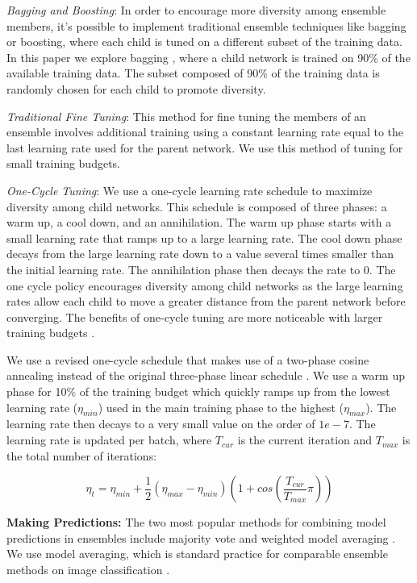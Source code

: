 \documentclass[letterpaper]{article} %
\begin{document}
\textit{Bagging and Boosting}:
In order to encourage more diversity among ensemble members, it's possible to implement traditional ensemble techniques like bagging or boosting, where each child is tuned on a different subset of the training data.   In this paper we explore bagging \cite{breiman1996bagging},  where a child network is trained on 90\%
of the available training data.  The subset composed of 90\% of the training data is randomly chosen for each child to promote diversity.

\textit{Traditional Fine Tuning}: This method for fine tuning the members of an ensemble involves additional training using a constant learning rate equal to the last learning rate used for the parent network. We use this method of tuning for small training budgets.

\textit{One-Cycle Tuning}: We use a one-cycle learning rate schedule \cite{smith2018superconvergence} to maximize diversity among child networks. This schedule is composed of three phases: a warm up, a cool down, and an annihilation. The warm up phase starts with a small learning rate that ramps up to a large learning rate. The cool down phase decays from the large learning rate down to a value several times smaller than the initial learning rate. The annihilation phase then decays the rate to 0. The one cycle policy encourages diversity among child networks as the large learning rates allow each child to move a greater distance from the parent network before converging.
The benefits of one-cycle tuning are more noticeable with larger training budgets \cite{le2021network}.

We use a revised one-cycle schedule that makes use of a two-phase cosine annealing instead of the original three-phase linear schedule \cite{le2021network}. We use a warm up phase for 10\% of the training budget which quickly ramps up from the lowest learning rate ($\eta_{min}$) used in the main training phase to the highest ($\eta_{max}$). The learning rate then decays to a very small value on the order of $1e-7$. The learning rate is updated per batch, where $T_{cur}$ is the current iteration and $T_{max}$ is the total number of iterations:

\[
\eta_t = \eta_{min} + \frac{1}{2}(\eta_{max} - \eta_{min})
(1 + cos(\frac{T_{cur}}{T_{max}} \pi))
\]

\textbf{Making Predictions:} The two most popular methods for combining model predictions in ensembles include majority vote and weighted model averaging \cite{fragoso2017bayesian, dzeroski2004combining, vanderlaan2007super}. We use model averaging, which is standard practice for comparable ensemble methods on image classification \cite{huang2017snapshot, garipov2018loss, liu2021freetickets, havasi2021training}.
\end{document}
